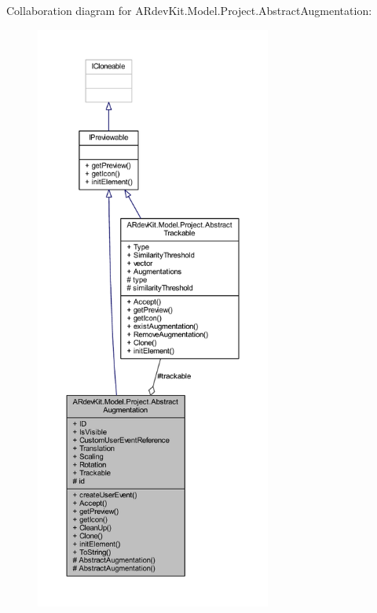 Collaboration diagram for A\-Rdev\-Kit.\-Model.\-Project.\-Abstract\-Augmentation\-:
\nopagebreak
\begin{figure}[H]
\begin{center}
\leavevmode
\includegraphics[height=550pt]{class_a_rdev_kit_1_1_model_1_1_project_1_1_abstract_augmentation__coll__graph}
\end{center}
\end{figure}
